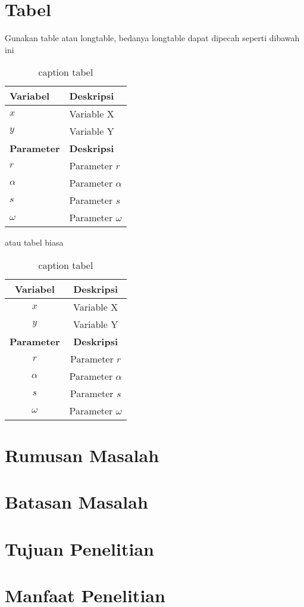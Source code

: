 \section{Tabel}
Gunakan table atau longtable, bedanya longtable dapat dipecah seperti dibawah ini
\begin{longtable}{ll}
    \caption{caption tabel}                   \\
    \toprule
    \textbf{Variabel}  & \textbf{Deskripsi}   \\
    \midrule
    $x$                & Variable X           \\
    $y$                & Variable Y           \\
    \midrule
    \textbf{Parameter} & \textbf{Deskripsi}   \\
    \midrule
    $r$                & Parameter $r$        \\
    $\alpha$           & Parameter $\alpha$   \\
    $s$                & Parameter  $s$       \\
    $\omega$           & Parameter   $\omega$ \\
    \bottomrule
\end{longtable}
\noindent atau tabel biasa
\begin{table}[h!]
    \centering
    \caption{caption tabel}
    \begin{tabular}{|c|c|}
        \hline
        \textbf{Variabel}  & \textbf{Deskripsi}   \\
        \hline
        $x$                & Variable X           \\
        $y$                & Variable Y           \\
        \hline
        \textbf{Parameter} & \textbf{Deskripsi}   \\
        \hline
        $r$                & Parameter $r$        \\
        $\alpha$           & Parameter $\alpha$   \\
        $s$                & Parameter  $s$       \\
        $\omega$           & Parameter   $\omega$ \\
        \hline
    \end{tabular}
\end{table}

\section{Rumusan Masalah}
\section{Batasan Masalah}
\section{Tujuan Penelitian}
\section{Manfaat Penelitian}